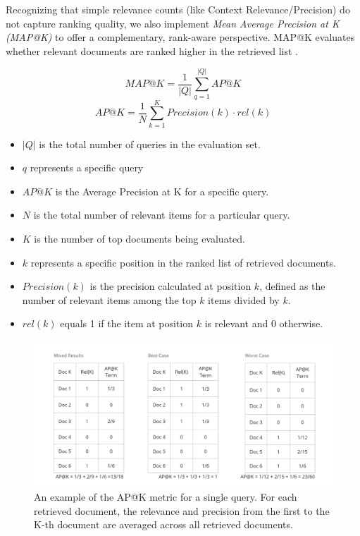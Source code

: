 Recognizing that simple relevance counts (like Context Relevance/Precision) do not capture ranking quality, we also implement \textit{Mean Average Precision at K (MAP@K)} to offer a complementary, rank-aware perspective. MAP@K evaluates whether relevant documents are ranked higher in the retrieved list \cite{EvidentlyAIInc..25.02.2025}. 

$$MAP@K=\frac{1}{|Q|}\sum_{q=1}^{|Q|}AP@K$$
$$AP@K=\frac{1}{N}\sum_{k=1}^{K}Precision(k) \cdot rel(k)$$
\begin{itemize}
  \item $|Q|$ is the total number of queries in the evaluation set.
  \item $q$ represents a specific query
  \item $AP@K$ is the Average Precision at K for a specific query.
  \item $N$ is the total number of relevant items for a particular query.
  \item $K$ is the number of top documents being evaluated.
  \item $k$ represents a specific position in the ranked list of retrieved documents.
  \item $Precision(k)$ is the precision calculated at position $k$, defined as the number of relevant items among the top $k$ items divided by $k$.
  \item $rel(k)$ equals 1 if the item at position $k$ is relevant and 0 otherwise.
\end{itemize}

\begin{figure}[!ht]
  \centering
  \includegraphics[width=\textwidth]{images/APatK.pdf}
  \caption{An example of the AP@K metric for a single query. For each retrieved document, the relevance and precision from the first to the K-th document are averaged across all retrieved documents.}
  \label{fig:APatK}
\end{figure}



